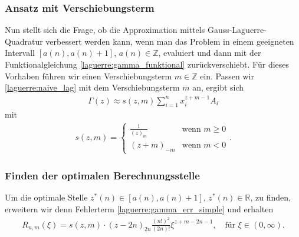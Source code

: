 \subsubsection{Ansatz mit Verschiebungsterm}
Nun stellt sich die Frage,
ob die Approximation mittels Gauss-Laguerre-Quadratur verbessert werden kann,
wenn man das Problem in einem geeigneten Intervall $[a(n), a(n)+1]$,
$a(n) \in \mathbb{Z}$,
evaluiert und dann mit der
Funktionalgleichung \eqref{laguerre:gamma_funktional} zurückverschiebt.
Für dieses Vorhaben führen wir einen Verschiebungsterm $m \in \mathbb{Z}$ ein.
Passen wir \eqref{laguerre:naive_lag}
mit dem Verschiebungsterm $m$
an,
ergibt sich
\begin{align}
\Gamma(z)
\approx
s(z, m) \sum_{i=1}^n x_i^{z + m - 1} A_i
\label{laguerre:shifted_lag}
\end{align}
mit
\begin{align*}
s(z, m)
=
\begin{cases}
\displaystyle
\frac{1}{(z)_m} & \text{wenn } m \geq 0 \\
(z + m)_{-m}    & \text{wenn } m < 0
\end{cases}
.
\end{align*}

\subsubsection{Finden der optimalen Berechnungsstelle}
Um die optimale Stelle $z^*(n) \in \left[a(n), a(n) + 1\right]$,
$z^*(n) \in \mathbb{R}$,
zu finden,
erweitern wir denn Fehlerterm \eqref{laguerre:gamma_err_simple}
und erhalten
\begin{align}
R_{n,m}(\xi)
=
s(z, m) \cdot (z - 2n)_{2n} \frac{(n!)^2}{(2n)!} \xi^{z + m - 2n - 1}
,\quad
\text{für }
\xi \in (0, \infty)
\label{laguerre:gamma_err_shifted}
.
\end{align}

